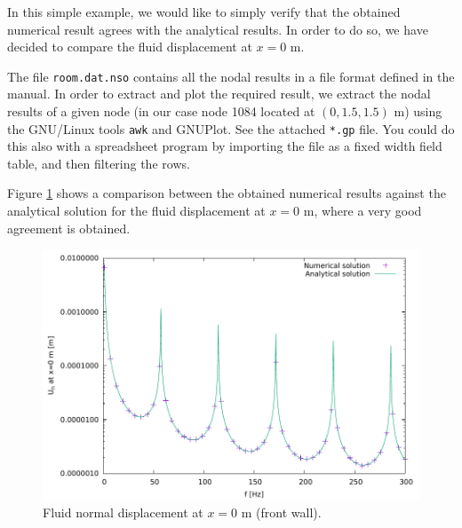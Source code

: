 \documentclass[a4]{article}
\begin{document}
In this simple example, we would like to simply verify that the obtained numerical result agrees with the analytical results. In order to do so, we have decided to compare the fluid displacement at $x=0$ m. 

The file \texttt{room.dat.nso} contains all the nodal results in a file format defined in the manual. In order to extract and plot the required result, we extract the nodal results of a given node (in our case node 1084 located at $(0,1.5,1.5)$ m) using the GNU/Linux tools \texttt{awk} and GNUPlot. See the attached \texttt{*.gp} file. You could do this also with a spreadsheet program by importing the file as a fixed width field table, and then filtering the rows.

Figure \ref{fig:sol} shows a comparison between the obtained numerical results against the analytical solution for the fluid displacement at $x=0$ m, where a very good agreement is obtained. 
 
 
\begin{figure}[h]
\centering
\includegraphics{solution1.pdf}
\caption{Fluid normal displacement at $x=0$ m (front wall).}
\label{fig:sol}
\end{figure}
\end{document}
